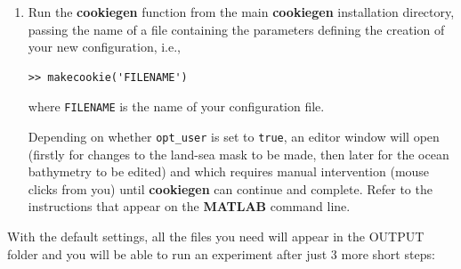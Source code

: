 \begin{enumerate}
\vspace{2mm}
\item Run the \textbf{cookiegen} function from the main \textbf{cookiegen} installation directory, passing the name of a file containing the parameters defining the creation of your new configuration, i.e.,
\vspace{0mm}\small\begin{verbatim}
>> makecookie('FILENAME')
\end{verbatim}\normalsize\vspace{0mm}
where \texttt{\small FILENAME} is the name of your configuration file.

\vspace{2mm}
Depending on whether \texttt{\small opt\_user} is set to \texttt{\small true}, an editor window will open (firstly for changes to the land-sea mask to be made, then later for the ocean bathymetry to be edited) and which requires manual intervention (mouse clicks from you) until \textbf{cookiegen} can continue and complete. Refer to the instructions that appear on the \textbf{MATLAB} command line.

\end{enumerate}

\newpage

\noindent With the default settings, all the files you need will appear in the \textsf{\footnotesize OUTPUT} folder and you will be able to run an experiment after just 3 more short steps:

